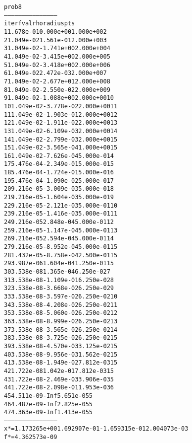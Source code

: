 \begin{alltt}
prob8
---------------------------------------------
iter        fval         rho      radius  pts
   1   1.678e-01   0.000e+00   1.000e+00    2
   2   1.049e-02   1.561e-01   2.000e+00    3
   3   1.049e-02  -1.741e+00   2.000e+00    4
   4   1.049e-02  -3.415e+00   2.000e+00    5
   5   1.049e-02  -3.418e+00   2.000e+00    6
   6   1.049e-02   2.472e-03   2.000e+00    7
   7   1.049e-02  -2.677e+01   2.000e+00    8
   8   1.049e-02  -2.550e-02   2.000e+00    9
   9   1.049e-02  -1.088e+00   2.000e+00   10
  10   1.049e-02  -3.778e-02   2.000e+00   11
  11   1.049e-02  -1.903e-01   2.000e+00   12
  12   1.049e-02  -1.911e-02   2.000e+00   13
  13   1.049e-02  -6.109e-03   2.000e+00   14
  14   1.049e-02  -2.799e-03   2.000e+00   15
  15   1.049e-02  -3.565e-04   1.000e+00   15
  16   1.049e-02  -7.626e-04   5.000e-01    4
  17   5.476e-04  -2.349e-01   5.000e-01    5
  18   5.476e-04  -1.724e-01   5.000e-01    6
  19   5.476e-04  -1.090e-02   5.000e-01    7
  20   9.216e-05  -3.009e-03   5.000e-01    8
  21   9.216e-05  -1.604e-03   5.000e-01    9
  22   9.216e-05  -2.121e-03   5.000e-01   10
  23   9.216e-05  -1.416e-03   5.000e-01   11
  24   9.216e-05   2.848e-04   5.000e-01   12
  25   9.216e-05  -1.147e-04   5.000e-01   13
  26   9.216e-05   2.594e-04   5.000e-01   14
  27   9.216e-05  -8.952e-04   5.000e-01   15
  28   1.432e-05  -8.758e-04   2.500e-01   15
  29   3.987e-06   1.604e-04   1.250e-01   15
  30   3.538e-08   1.365e-04   6.250e-02    7
  31   3.538e-08  -1.109e-01   6.250e-02    8
  32   3.538e-08  -3.668e-02   6.250e-02    9
  33   3.538e-08  -3.597e-02   6.250e-02   10
  34   3.538e-08  -4.208e-02   6.250e-02   11
  35   3.538e-08  -5.060e-02   6.250e-02   12
  36   3.538e-08  -8.999e-02   6.250e-02   13
  37   3.538e-08  -3.565e-02   6.250e-02   14
  38   3.538e-08  -3.725e-02   6.250e-02   15
  39   3.538e-08  -4.570e-03   3.125e-02   15
  40   3.538e-08  -9.956e-03   1.562e-02   15
  41   3.538e-08  -1.949e-02   7.812e-03   15
  42   1.722e-08   1.042e-01   7.812e-03   15
  43   1.722e-08  -2.469e-03   3.906e-03    5
  44   1.722e-08  -2.098e-01   1.953e-03    6
  45   4.511e-09        -Inf   5.651e-05    5
  46   4.487e-09        -Inf   2.825e-05    5
  47   4.363e-09        -Inf   1.413e-05    5
---------------------------------------------
x* = 1.173265e+00  1.692907e-01  -1.659315e-01  2.004073e-03  
f* = 4.362573e-09
\end{alltt}

